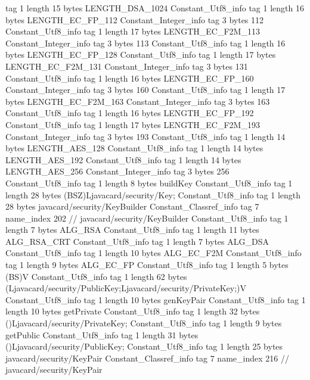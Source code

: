 {{{			tag	1
			length	15
			bytes	LENGTH_DSA_1024
		}
		Constant_Utf8_info {
			tag	1
			length	16
			bytes	LENGTH_EC_FP_112
		}
		Constant_Integer_info {
			tag	3
			bytes	112
		}
		Constant_Utf8_info {
			tag	1
			length	17
			bytes	LENGTH_EC_F2M_113
		}
		Constant_Integer_info {
			tag	3
			bytes	113
		}
		Constant_Utf8_info {
			tag	1
			length	16
			bytes	LENGTH_EC_FP_128
		}
		Constant_Utf8_info {
			tag	1
			length	17
			bytes	LENGTH_EC_F2M_131
		}
		Constant_Integer_info {
			tag	3
			bytes	131
		}
		Constant_Utf8_info {
			tag	1
			length	16
			bytes	LENGTH_EC_FP_160
		}
		Constant_Integer_info {
			tag	3
			bytes	160
		}
		Constant_Utf8_info {
			tag	1
			length	17
			bytes	LENGTH_EC_F2M_163
		}
		Constant_Integer_info {
			tag	3
			bytes	163
		}
		Constant_Utf8_info {
			tag	1
			length	16
			bytes	LENGTH_EC_FP_192
		}
		Constant_Utf8_info {
			tag	1
			length	17
			bytes	LENGTH_EC_F2M_193
		}
		Constant_Integer_info {
			tag	3
			bytes	193
		}
		Constant_Utf8_info {
			tag	1
			length	14
			bytes	LENGTH_AES_128
		}
		Constant_Utf8_info {
			tag	1
			length	14
			bytes	LENGTH_AES_192
		}
		Constant_Utf8_info {
			tag	1
			length	14
			bytes	LENGTH_AES_256
		}
		Constant_Integer_info {
			tag	3
			bytes	256
		}
		Constant_Utf8_info {
			tag	1
			length	8
			bytes	buildKey
		}
		Constant_Utf8_info {
			tag	1
			length	28
			bytes	(BSZ)Ljavacard/security/Key;
		}
		Constant_Utf8_info {
			tag	1
			length	28
			bytes	javacard/security/KeyBuilder
		}
		Constant_Classref_info {
			tag	7
			name_index	202		// javacard/security/KeyBuilder
		}
		Constant_Utf8_info {
			tag	1
			length	7
			bytes	ALG_RSA
		}
		Constant_Utf8_info {
			tag	1
			length	11
			bytes	ALG_RSA_CRT
		}
		Constant_Utf8_info {
			tag	1
			length	7
			bytes	ALG_DSA
		}
		Constant_Utf8_info {
			tag	1
			length	10
			bytes	ALG_EC_F2M
		}
		Constant_Utf8_info {
			tag	1
			length	9
			bytes	ALG_EC_FP
		}
		Constant_Utf8_info {
			tag	1
			length	5
			bytes	(BS)V
		}
		Constant_Utf8_info {
			tag	1
			length	62
			bytes	(Ljavacard/security/PublicKey;Ljavacard/security/PrivateKey;)V
		}
		Constant_Utf8_info {
			tag	1
			length	10
			bytes	genKeyPair
		}
		Constant_Utf8_info {
			tag	1
			length	10
			bytes	getPrivate
		}
		Constant_Utf8_info {
			tag	1
			length	32
			bytes	()Ljavacard/security/PrivateKey;
		}
		Constant_Utf8_info {
			tag	1
			length	9
			bytes	getPublic
		}
		Constant_Utf8_info {
			tag	1
			length	31
			bytes	()Ljavacard/security/PublicKey;
		}
		Constant_Utf8_info {
			tag	1
			length	25
			bytes	javacard/security/KeyPair
		}
		Constant_Classref_info {
			tag	7
			name_index	216		// javacard/security/KeyPair
}}}
